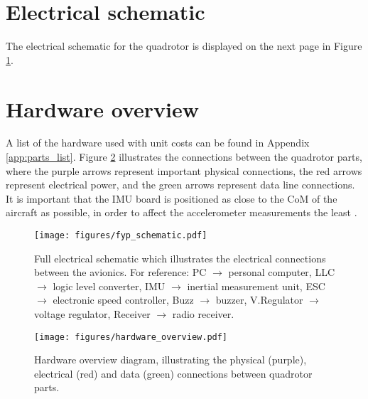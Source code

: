 \section{Electrical schematic}
The electrical schematic for the quadrotor is displayed on the next page in Figure \ref{fig:elec_schematic}.

\section{Hardware overview}
A list of the hardware used with unit costs can be found in Appendix \ref{app:parts_list}. Figure \ref{fig:hardware_overview} illustrates the connections between the quadrotor parts, where the purple arrows represent important physical connections, the red arrows represent electrical power, and the green arrows represent data line connections. It is important that the \ac{IMU} board is positioned as close to the \ac{CoM} of the aircraft as possible, in order to affect the accelerometer measurements the least \cite{basicairdata2011imu_placement}.

\begin{landscape}
\begin{figure}
    \centering
    \texttt{[image: figures/fyp\_schematic.pdf]}
    \caption{Full electrical schematic which illustrates the electrical connections between the avionics. For reference: PC $\rightarrow$ personal computer, LLC $\rightarrow$ logic level converter, IMU $\rightarrow$ inertial measurement unit, ESC $\rightarrow$ electronic speed controller, Buzz $\rightarrow$ buzzer, V.Regulator $\rightarrow$ voltage regulator, Receiver $\rightarrow$ radio receiver.}
    \label{fig:elec_schematic}
\end{figure}
\end{landscape}

\begin{figure}[htpb!]
    \centering
    \texttt{[image: figures/hardware\_overview.pdf]}
    \caption{Hardware overview diagram, illustrating the physical (purple), electrical (red) and data (green) connections between quadrotor parts.}
    \label{fig:hardware_overview}
\end{figure}




